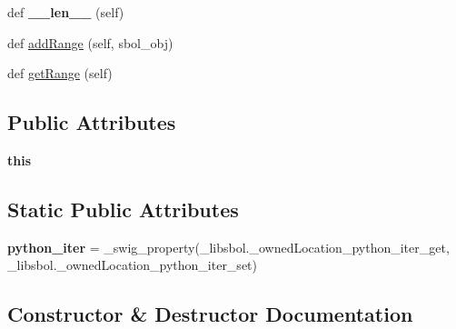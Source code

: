 \begin{DoxyCompactItemize}
\item 
def {\bfseries \+\_\+\+\_\+len\+\_\+\+\_\+} (self)\hypertarget{classsbol_1_1libsbol_1_1__owned_location_a61192a1cb7ba63dc5403315ddd5d84e5}{}\label{classsbol_1_1libsbol_1_1__owned_location_a61192a1cb7ba63dc5403315ddd5d84e5}

\item 
def \hyperlink{classsbol_1_1libsbol_1_1__owned_location_aa810197acf9b40661452f98abc7e2f3a}{add\+Range} (self, sbol\+\_\+obj)
\item 
def \hyperlink{classsbol_1_1libsbol_1_1__owned_location_a9ab9567a586e5c0ad933a6c6b5052dfd}{get\+Range} (self)
\end{DoxyCompactItemize}
\subsection*{Public Attributes}
\begin{DoxyCompactItemize}
\item 
{\bfseries this}\hypertarget{classsbol_1_1libsbol_1_1__owned_location_ad64da493a48de3f15ea5dc84ba17b3f8}{}\label{classsbol_1_1libsbol_1_1__owned_location_ad64da493a48de3f15ea5dc84ba17b3f8}

\end{DoxyCompactItemize}
\subsection*{Static Public Attributes}
\begin{DoxyCompactItemize}
\item 
{\bfseries python\+\_\+iter} = \+\_\+swig\+\_\+property(\+\_\+libsbol.\+\_\+owned\+Location\+\_\+python\+\_\+iter\+\_\+get, \+\_\+libsbol.\+\_\+owned\+Location\+\_\+python\+\_\+iter\+\_\+set)\hypertarget{classsbol_1_1libsbol_1_1__owned_location_a60a5a5fb1cbe11fd4768fa62583cf5de}{}\label{classsbol_1_1libsbol_1_1__owned_location_a60a5a5fb1cbe11fd4768fa62583cf5de}

\end{DoxyCompactItemize}


\subsection{Constructor \& Destructor Documentation}
